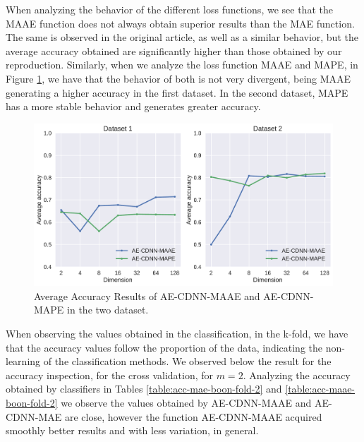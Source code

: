 When analyzing the behavior of the different loss functions, we see that the MAAE function does not always obtain superior results than the MAE function. The same is observed in the original article, as well as a similar behavior, but the average accuracy obtained are significantly higher than those obtained by our reproduction. Similarly, when we analyze the loss function MAAE and MAPE, in Figure \ref{fig:average-maae-mape}, we have that the behavior of both is not very divergent, being MAAE generating a higher accuracy in the first dataset. In the second dataset, MAPE has a more stable behavior and generates greater accuracy. 


\begin{figure}[!ht]
\centering
\includegraphics[width=0.8\linewidth]{figure/average-MAAE-MAPE.pdf}
    \caption{Average Accuracy Results of AE-CDNN-MAAE and AE-CDNN-MAPE in the two dataset.}
\label{fig:average-maae-mape}
\end{figure}

When observing the values obtained in the classification, in the k-fold, we have that the accuracy values follow the proportion of the data, indicating the non-learning of the classification methods. We observed below the result for the accuracy inspection, for the cross validation, for $m = 2$. Analyzing the accuracy obtained by classifiers in Tables \ref{table:acc-mae-boon-fold-2} and \ref{table:acc-maae-boon-fold-2} we observe the values obtained by AE-CDNN-MAAE and AE-CDNN-MAE are close, however the function AE-CDNN-MAAE acquired smoothly better results and with less variation, in general. 


